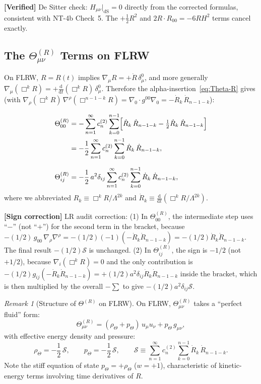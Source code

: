 \documentclass[12pt,a4paper]{article}
\theoremstyle{definition}
\theoremstyle{remark}
\newtheorem{remark}[proposition]{Remark}
\newcommand{\dd}{\mathrm{d}}
\newcommand{\verified}[1]{%
  \par\smallskip\noindent
  \colorbox{green!10}{\parbox{\dimexpr\linewidth-2\fboxsep}{%
    \textcolor{green!50!black}{\textbf{[Verified]}} #1}}%
  \par\smallskip}
\newcommand{\signcorrection}[1]{%
  \par\noindent\colorbox{red!10}{%
    \parbox{\dimexpr\linewidth-2\fboxsep}{%
      \textcolor{red!50!black}{\textbf{[Sign correction]}}
      \textcolor{red!50!black}{#1}%
    }%
  }\par%
}
\begin{document}
\verified{De Sitter check: $H_{\mu\nu}|_{\mathrm{dS}} = 0$ directly
from the corrected formulas, consistent with NT-4b Check~5.
The $+\tfrac{1}{2}R^2$ and $2R\cdot R_{00} = -6R H^2$ terms cancel exactly.}

\subsection{The $\Theta^{(R)}_{\mu\nu}$ Terms on FLRW}

On FLRW, $R = R(t)$ implies $\nabla_\mu R = +\dot{R}\,\delta^0_\mu$,
and more generally $\nabla_\mu(\Box^k R) = +\frac{\dd}{\dd t}(\Box^k R)
\,\delta^0_\mu$. Therefore the alpha-insertion~\eqref{eq:Theta-R}
gives (with
$\nabla_\rho(\Box^k R)\,\nabla^\rho(\Box^{n-1-k} R)
= \nabla_0\cdot g^{00}\nabla_0 = -\dot{R}_k\,\dot{R}_{n-1-k}$):

\begin{align}
  \Theta^{(R)}_{00} &= -\sum_{n=1}^{\infty} c_n^{(2)}
  \sum_{k=0}^{n-1}
  \Bigl[\dot{R}_k\,\dot{R}_{n-1-k}
  - \tfrac{1}{2}\dot{R}_k\,\dot{R}_{n-1-k}\Bigr] \notag\\
  &= -\frac{1}{2}\sum_{n=1}^{\infty} c_n^{(2)}
  \sum_{k=0}^{n-1} \dot{R}_k\,\dot{R}_{n-1-k},
  \label{eq:Theta00}\\[6pt]
  \Theta^{(R)}_{ij} &= -\frac{1}{2}\,a^2\delta_{ij}
  \sum_{n=1}^{\infty} c_n^{(2)}
  \sum_{k=0}^{n-1} \dot{R}_k\,\dot{R}_{n-1-k},
  \label{eq:Thetaij}
\end{align}
where we abbreviated $R_k \equiv \Box^k R/\Lambda^{2k}$ and
$\dot{R}_k \equiv \frac{\dd}{\dd t}(\Box^k R/\Lambda^{2k})$.

\signcorrection{LR audit correction: (1) In $\Theta^{(R)}_{00}$,
the intermediate step uses ``$-$'' (not ``$+$'') for the second term
in the bracket, because $-(1/2)\,g_{00}\,\nabla_\rho\nabla^\rho
= -(1/2)(-1)(-\dot{R}_k\dot{R}_{n-1-k}) = -(1/2)\dot{R}_k\dot{R}_{n-1-k}$.
The final result $-(1/2)\mathcal{S}$ is unchanged.
(2) In $\Theta^{(R)}_{ij}$, the sign is $-1/2$ (not $+1/2$), because
$\nabla_i(\Box^k R) = 0$ and the only contribution is
$-(1/2)g_{ij}(-\dot{R}_k\dot{R}_{n-1-k}) = +(1/2)a^2\delta_{ij}
\dot{R}_k\dot{R}_{n-1-k}$ inside the bracket, which is then multiplied
by the overall $-\sum$ to give $-(1/2)a^2\delta_{ij}\mathcal{S}$.}

\begin{remark}[Structure of $\Theta^{(R)}$ on FLRW]
On FLRW, $\Theta^{(R)}_{\mu\nu}$ takes a ``perfect fluid'' form:
\begin{equation}\label{eq:Theta-pf}
  \Theta^{(R)}_{\mu\nu} = (\rho_\Theta + p_\Theta)\,u_\mu u_\nu
  + p_\Theta\,g_{\mu\nu},
\end{equation}
with effective energy density and pressure:
\begin{equation}\label{eq:rho-p-Theta}
  \rho_\Theta = -\frac{1}{2}\,\mathcal{S},
  \qquad
  p_\Theta = -\frac{1}{2}\,\mathcal{S},
  \qquad
  \mathcal{S} \equiv \sum_{n=1}^{\infty} c_n^{(2)}
  \sum_{k=0}^{n-1} \dot{R}_k\,\dot{R}_{n-1-k}.
\end{equation}
Note the stiff equation of state $p_\Theta = +\rho_\Theta$
($w = +1$), characteristic of kinetic-energy terms involving time
derivatives of $R$.
\end{remark}
\end{document}
